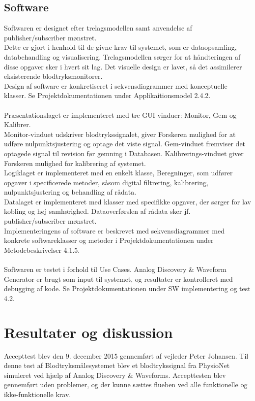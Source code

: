 \subsection{Software}
Softwaren er designet efter trelagsmodellen samt anvendelse af publisher/subscriber mønstret. \\
Dette er gjort i henhold til de givne krav til systemet, som er dataopsamling, databehandling og visualisering. Trelagsmodellen sørger for at håndteringen af disse opgaver sker i hvert sit lag. Det visuelle design er lavet, så det assimilerer eksisterende blodtryksmonitorer. \\
Design af software er konkretiseret i sekvensdiagrammer med konceptuelle klasser. Se Projektdokumentationen under Applikaitionsmodel 2.4.2.  
\\\\
Præsentationslaget er implementeret med tre GUI vinduer: Monitor, Gem og Kalibrer.\\ 
Monitor-vinduet udskriver blodtrykssignalet, giver Forskeren mulighed for at udføre nulpunktsjustering og optage det viste signal. Gem-vinduet fremviser det optagede signal til revision før gemning i Databasen. Kalibrerings-vinduet giver Forskeren mulighed for kalibrering af systemet.\\ 
Logiklaget er implementeret med en enkelt klasse, Beregninger, som udfører opgaver i specificerede metoder, såsom digital filtrering, kalibrering, nulpunktsjustering og behandling af rådata.\\
Datalaget er implementeret med klasser med specifikke opgaver, der sørger for lav kobling og høj samhørighed. Dataoverførslen af rådata sker jf. publisher/subscriber mønstret. \\
Implementeringens af software er beskrevet med sekvensdiagrammer med konkrete softwareklasser og metoder i Projektdokumentationen under Metodebeskrivelser 4.1.5.
\\\\
Softwaren er testet i forhold til Use Cases. Analog Discovery \& Waveform Generator er brugt som input til systemet, og resultater er kontrolleret med debugging af kode. Se Projektdokumentationen under SW implementering og test 4.2.


\section{Resultater og diskussion}
Accepttest blev den 9. december 2015 gennemført af vejleder Peter Johansen. Til denne test af Blodtryksmålesystemet blev et blodtrykssignal fra PhysioNet \cite{PhysioNet} simuleret ved hjælp af Analog Discovery \& Waveforms. Accepttesten blev gennemført uden problemer, og der kunne sættes flueben ved alle funktionelle og ikke-funktionelle krav. 

